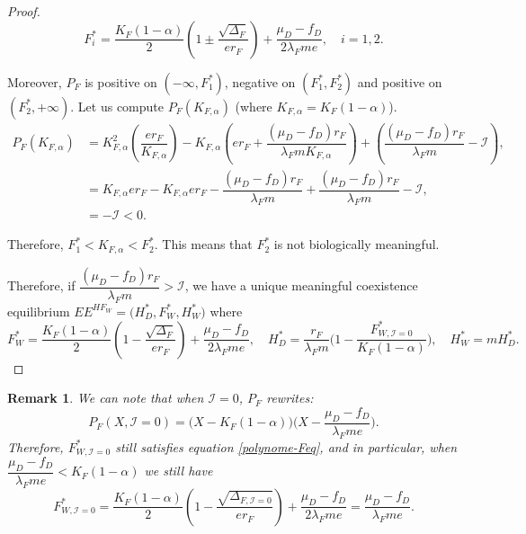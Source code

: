 \documentclass{article}
\newcommand{\lfw}{\lambda_{F}}
\newcommand{\lfw}{\lambda_{F}}
\newcommand{\cI}{\mathcal{I}}
\newcommand{\marc}[1]{\textcolor{teal}{#1}}
\newtheorem{remark}{Remark}
\begin{document}
\begin{proof}
\begin{equation*}
F_i^* = \dfrac{K_F(1-\alpha)}{2}\left(1 \pm \dfrac{\sqrt{\Delta_F}}{er_F}\right) + \dfrac{\mu_D - f_D}{2\lfw m e}, \quad i=1,2.
\end{equation*}

Moreover, $P_F$ is positive on $(-\infty, F_1^*)$, negative on $(F^*_1, F^*_2)$ and positive on $(F^*_2, +\infty)$. Let us compute $P_F(K_{F,\alpha})$ (where $ K_{F,\alpha} = K_F(1-\alpha)$).
\begin{align*}
P_F(K_{F,\alpha}) &= K_{F,\alpha}^2 \left(\dfrac{er_F}{K_{F,\alpha}} \right) - K_{F,\alpha} \left(er_F + \dfrac{(\mu_D - f_D) r_F}{\lfw m K_{F,\alpha}} \right) + \left(\dfrac{(\mu_D - f_D) r_F}{\lfw m} - \cI \right), \\
&= K_{F,\alpha}er_F - K_{F,\alpha}er_F - \dfrac{(\mu_D - f_D) r_F}{\lfw m} + \dfrac{(\mu_D - f_D) r_F}{\lfw m} - \cI, \\
&= -\cI< 0.
\end{align*}

Therefore, $F_1^* < K_{F, \alpha} < F_2^*$. This means that $F_2^*$ is not biologically meaningful.

Therefore, if $\dfrac{(\mu_D - f_D) r_F}{\lfw m} > \cI$, we have a unique meaningful coexistence equilibrium $EE^{HF_W} = \Big(H^*_{D}, F^*_{W}, H^*_{W} \Big)$  
where $$F^*_{W} = \dfrac{K_F(1-\alpha)}{2}\left(1 - \dfrac{\sqrt{\Delta_F}}{er_F}\right) + \dfrac{\mu_D - f_D}{2\lfw m e},\quad
H^*_{D} = \dfrac{r_F}{\lfw m} \Big(1 - \dfrac{F^*_{W, \cI = 0}}{K_F(1-\alpha)} \Big),
\quad 
H^*_{W} = m H^*_{D}.$$
\end{proof}

\begin{remark} \label{RemarqueSimilariteEqCoexistence}
We can note that when $\cI=0$, $P_F$ rewrites:
$$
P_F(X, \cI=0) = \Big(X-K_F(1-\alpha) \Big) \Big(X - \dfrac{\mu_D - f_D}{\lfw m e} \Big).
$$
Therefore, $F^*_{W,\cI =0}$ still satisfies equation \eqref{polynome-Feq}, and in particular, when $\dfrac{\mu_D - f_D}{\lfw m e} < K_F(1-\alpha)$ we still have
$$
F^*_{W, \cI =0} = \dfrac{K_F(1-\alpha)}{2}\left(1 - \dfrac{\sqrt{\Delta_{F, \cI = 0}}}{er_F}\right) + \dfrac{\mu_D - f_D}{2\lfw m e} = \dfrac{\mu_D - f_D}{\lfw m e}.
$$ 
\end{remark}

%
\end{document}
